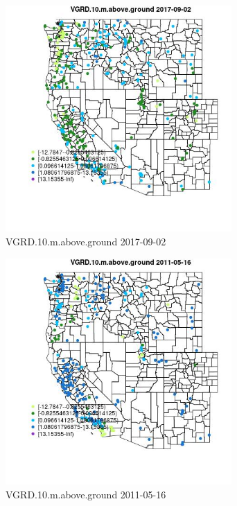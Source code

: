 \begin{figure} 
\centering  
\includegraphics[width=0.77\textwidth]{Code_Outputs/Report_ML_input_PM25_Step4_part_e_de_duplicated_aves_compiled_2019-05-21wNAs_MapObsVGRD10maboveground2017-09-02.jpg} 
\caption{\label{fig:Report_ML_input_PM25_Step4_part_e_de_duplicated_aves_compiled_2019-05-21wNAsMapObsVGRD10maboveground2017-09-02}VGRD.10.m.above.ground 2017-09-02} 
\end{figure} 
 

\begin{figure} 
\centering  
\includegraphics[width=0.77\textwidth]{Code_Outputs/Report_ML_input_PM25_Step4_part_e_de_duplicated_aves_compiled_2019-05-21wNAs_MapObsVGRD10maboveground2011-05-16.jpg} 
\caption{\label{fig:Report_ML_input_PM25_Step4_part_e_de_duplicated_aves_compiled_2019-05-21wNAsMapObsVGRD10maboveground2011-05-16}VGRD.10.m.above.ground 2011-05-16} 
\end{figure} 
 


